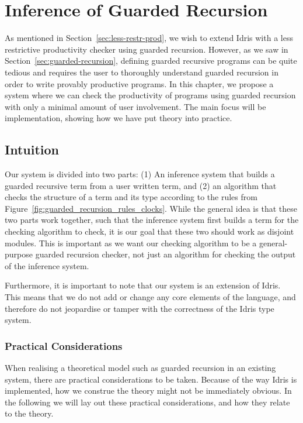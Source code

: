 \chapter{Inference of Guarded Recursion}
\label{cha:infer-guard-recurs}
As mentioned in Section~\ref{sec:less-restr-prod}, we wish to extend Idris with
a less restrictive productivity checker using guarded recursion. However, as
we saw in Section~\ref{sec:guarded-recursion}, defining guarded recursive
programs can be quite tedious and requires the user to thoroughly understand guarded
recursion in order to write provably productive programs. In this chapter, we propose a system
where we can check the productivity of programs using guarded recursion with
only a minimal amount of user involvement. The main focus will be
implementation, showing how we have put theory into practice.
\section{Intuition}
Our system is divided into two parts: (1) An inference system that builds a
guarded recursive term from a user written term, and (2) an algorithm that
checks the structure of a term and its type according to the rules from 
Figure~\ref{fig:guarded_recursion_rules_clocks}. While the general idea is that
these two parts work together, such that the inference system first builds a term
for the checking algorithm to check, it is our goal that these two should work
as disjoint modules. This is important as we want our checking algorithm to be a
general-purpose guarded recursion checker, not just an algorithm for checking
the output of the inference system.

Furthermore, it is important to note that our system is an extension of
Idris. This means that we do not add or change any core elements of the language, and
therefore do not jeopardise or tamper with the correctness of the Idris type system.

\subsection{Practical Considerations}
When realising a theoretical model such as guarded recursion in an existing
system, there are practical considerations to be taken. Because of the way Idris
is implemented, how we construe the theory might not be immediately obvious. In
the following we will lay out these practical considerations, and how they
relate to the theory.

